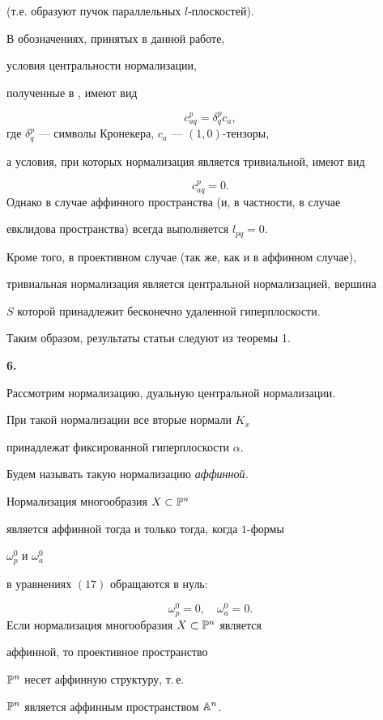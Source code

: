 (т.е. образуют пучок параллельных $l$-плоскостей).





В обозначениях, принятых в данной работе,


условия центральности нормализации,


полученные в \cite{A52}, имеют вид


$$


c_{aq}^p = \delta_q^p c_a,


$$
где $\delta_q^p$ --- символы Кронекера, $c_a$ --- $(1, 0)$-тензоры,


а условия, при которых нормализация является тривиальной, имеют вид


$$


c_{aq}^p = 0.


$$
Однако в случае аффинного пространства (и, в частности, в случае


евклидова пространства) всегда выполняется $l_{pq} = 0$.


 Кроме того, в проективном случае (так же, как и в аффинном случае),


тривиальная нормализация является центральной нормализацией, вершина


$S$ которой принадлежит бесконечно удаленной гиперплоскости.


Таким образом, результаты статьи \cite{A52} следуют из теоремы 1.


\medskip





{\bf 6.}


Рассмотрим нормализацию, дуальную центральной нормализации.


При такой нормализации все вторые нормали $K_x$


принадлежат фиксированной гиперплоскости $\alpha$.


Будем называть такую нормализацию {\it аффинной.}





\begin{thm}


Нормализация многообразия $X \subset \Bbb{P}^n$


является аффинной тогда и только тогда, когда $1$-формы


$\omega^0_p$ и $\omega^0_a$


в уравнениях $(17)$ обращаются в нуль\/${:}$


\begin{equation}
\omega_p^0 = 0, \quad \omega_a^0 = 0.
\end{equation}
Если нормализация многообразия $X \subset \Bbb{P}^n$ является


аффинной, то проективное пространство


$\Bbb{P}^n$ несет аффинную структуру, т.\,е.


$\Bbb{P}^n$ является аффинным пространством $\Bbb{A}^n$.


\end{thm}

